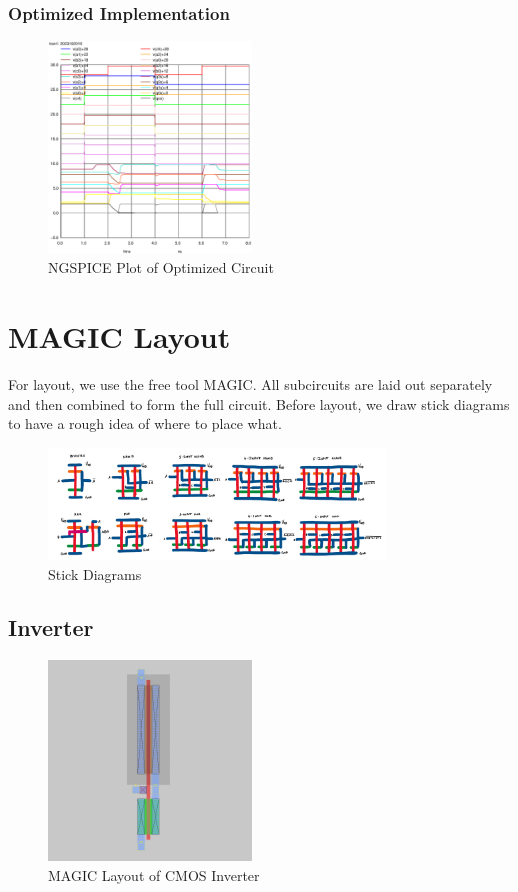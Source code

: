 \documentclass[conference]{IEEEtran}
\begin{document}
\subsubsection{Optimized Implementation}

\begin{figure}[H]
    \centering
    \includegraphics[width=0.48\textwidth]{images/full_optimized_tran.eps}
    \caption{NGSPICE Plot of Optimized Circuit}
\end{figure}

\section{MAGIC Layout}
For layout, we use the free tool MAGIC. All subcircuits are laid out separately and then combined to form the full circuit. Before layout, we draw stick diagrams to have a rough idea of where to place what.

\begin{figure}[t]
    \centering
    \includegraphics[width=0.8\textwidth]{images/stick_diagrams.png}
    \caption{Stick Diagrams}
\end{figure}

\subsection{Inverter}

\begin{figure}[H]
    \centering
    \includegraphics[width=0.48\textwidth]{images/inv_cmos_layout.png}
    \caption{MAGIC Layout of CMOS Inverter}
\end{figure}
\end{document}
